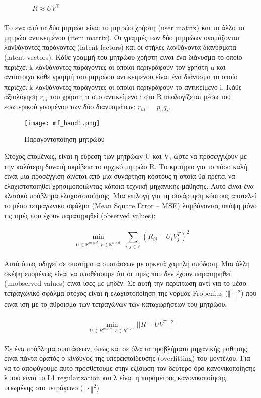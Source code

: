 \begin{itemize}
\qquad\	\qquad\ \qquad\ \qquad\ \qquad\ \qquad\ \qquad\ \quad\ $ R\approx UV^\top $
\\\\
Το ένα από τα δύο μητρώα είναι το μητρώο χρήστη (user matrix) και το άλλο το μητρώο αντικειμένου (item matrix). Οι γραμμές των δύο μητρώων ονομάζονται λανθάνοντες παράγοντες (latent factors) και οι στήλες λανθάνοντα διανύσματα (latent vectors). Κάθε γραμμή του μητρώου χρήστη είναι ένα διάνυσμα το οποίο περιέχει k λανθάνοντες παράγοντες οι οποίοι περιγράφουν τον χρήστη u και αντίστοιχα κάθε γραμμή του μητρώου αντικειμένου είναι ένα διάνυσμα το οποίο περιέχει k λανθάνοντες παράγοντες οι οποίοι περιγράφουν το αντικείμενο i. 
Κάθε αξιολόγηση $ r_{ui} $ του χρήστη u στο αντικείμενο i στο R υπολογίζεται μέσω του εσωτερικού γινομένου των δύο διανυσμάτων: $ r_{ui}=\ p_uq_i $. 
\begin{figure}[!htb]
\centering
\texttt{[image: mf\_hand1.png]}
\caption{Παραγοντοποίηση μητρώου}
\label{fig:mf}
\end{figure}
Στόχος επομένως, είναι η εύρεση των μητρώων U και V, ώστε να προσεγγίζουν με την καλύτερη δυνατή ακρίβεια το αρχικό μητρώο R. Το κριτήριο για το πόσο καλή είναι μια προσέγγιση δίνεται από μια συνάρτηση κόστους η οποία θα πρέπει να ελαχιστοποιηθεί χρησιμοποιώντας κάποια τεχνική μηχανικής μάθησης. Αυτό είναι ένα κλασικό πρόβλημα ελαχιστοποίησης. Μια επιλογή για τη συνάρτηση κόστους αποτελεί το μέσο τετραγωνικό σφάλμα (Mean Square Error – MSE) λαμβάνοντας υπόψη μόνο τις τιμές που έχουν παρατηρηθεί (observed values):
\\
\qquad\	\qquad\ \qquad\ \qquad\ \[  \min_{\substack{U\in\mathbb{R}^{m\times d},V\in\mathbb{R}^{n\times d}}}{\sum_{i,j\in\mathbb{Z}}\left(R_{ij}-U_iV_j^T\right)^2} 
\]
\\
Αυτό όμως οδηγεί σε συστήματα συστάσεων με αρκετά χαμηλή απόδοση. Μια άλλη σκέψη επομένως είναι να υποθέσουμε ότι οι τιμές που δεν έχουν παρατηρηθεί (unobserved values) είναι ίσες με μηδέν. Σε αυτή την περίπτωση αντί για το μέσο τετραγωνικό σφάλμα στόχος είναι η ελαχιστοποίηση της νόρμας Frobenius ($ ‖·‖^2 $) που είναι ίση με το άθροισμα των τετραγώνων των καταχωρήσεων του μητρώου:\\
\qquad\	\qquad\ \qquad\ \qquad\ \[ \mathop{\min}_{{U \in R^{m \times d}, V \in R^{n \times d}}}||R-UV^\mathsf{T}||^2 \]
\\
Σε ένα πρόβλημα συστάσεων, όπως και σε όλα τα προβλήματα μηχανικής μάθησης, είναι πάντα ορατός ο κίνδυνος της υπερεκπαίδευσης (overfitting) του μοντέλου. Για να το αποφύγουμε αυτό προσθέτουμε στην εξίσωση τον δεύτερο όρο κανονικοποίησης λ που είναι το  L1 regularization και λ είναι η παράμετρος κανονικοποίησης υψωμένης στο τετράγωνο ($ ‖·‖^2 $) \cite{korenMatrixFactorizationTechniques2009}

\end{itemize}
